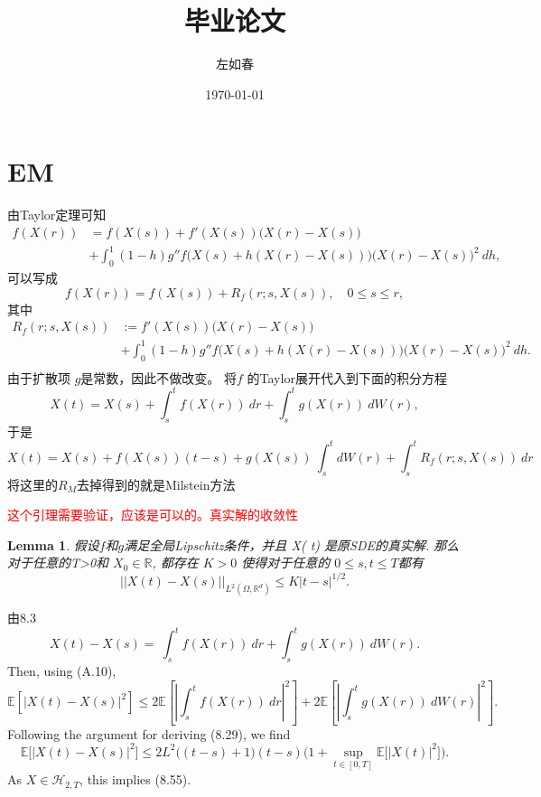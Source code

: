 \documentclass[12pt,final]{article}
\title{毕业论文}
\author{左如春}
\date{\today}
\makeatletter
\numberwithin{equation}{section}
\numberwithin{figure}{section}
\numberwithin{table}{section}
\theoremstyle{plain}
\renewcommand{\proofname}{proof}
\newtheorem{Lemma}[Theorem]{Lemma}      %
\theoremstyle{Definition}
\theoremstyle{Remark}
\renewenvironment{proof}[1][\proofname]{\par
	\pushQED{\qed}%
	\normalfont \topsep6\p@\@plus6\p@\relax
	\trivlist\item[\hskip\labelsep
	\bfseries #1\@addpunct{\,:\,}]\ignorespaces
}{%
	\popQED\endtrivlist\@endpefalse
}
\makeatother
\begin{document}
	
	\maketitle
	
	
	\section{EM}
	由Taylor定理可知
	$$\begin{aligned}
		f(X(r))&=f(X(s))+f'(X(s))\big(X(r)-X(s)\big)\\&+\int_{0}^{1}(1-h)g''f\big(X(s)+h(X(r)-X(s))\big)\big(X(r)-X(s)\big)^{2}\:dh,
	\end{aligned}$$
	可以写成
	$$f(X(r))=f(X(s))+R_f(r;s,X(s)),\quad0\leq s\leq r,$$
	其中
	$$\begin{aligned}
		R_{f}(r;s,X(s))&:=f'(X(s))\big(X(r)-X(s)\big)\\&+\int_{0}^{1}(1-h)g''f\big(X(s)+h(X(r)-X(s))\big)\big(X(r)-X(s)\big)^{2}\:dh.\\
	\end{aligned}$$
	由于扩散项 $g$是常数，因此不做改变。
	将$f$ 的Taylor展开代入到下面的积分方程
	\begin{equation}\label{int}
		X(t)=X(s)+\int_s^tf(X(r))\:dr+\int_s^tg(X(r))\:dW(r),
	\end{equation}
	于是
	\begin{equation}\label{Mil}
		X(t)=X(s)+f(X(s))(t-s)+g(X(s))\:\int_{s}^{t}dW(r)+\int_{s}^{t}R_{f}(r;s,X(s))\:dr
	\end{equation}
	将这里的$R_M$去掉得到的就是Milstein方法
	
	\textcolor{red}{这个引理需要验证，应该是可以的。真实解的收敛性}
	\begin{Lemma}
		假设$f$和$g$满足全局Lipschitz条件，并且  X( t) 是原SDE的真实解. 那么对于任意的T>0和
		${X}_{0}\in \mathbb{R}$, 都存在 $K> 0$ 使得对于任意的 $0\leq s, t\leq T$都有
		\begin{equation}
			||X(t)-X(s)||_{L^2(\Omega,\mathbb{R}^d)}\leq K|t-s|^{1/2}.
		\end{equation}
	\end{Lemma}
	
	\begin{proof}
		由8.3
		$$X(t)-X(s)=\:\int_{s}^{t}f(X(r))\:dr+\int_{s}^{t}g(X(r))\:dW(r).$$
		Then, using (A.10),
		$$\mathbb{E}\left[\left|X(t)-X(s)\right|^2\right]\leq2\mathbb{E}\left[\left|\int_s^tf(X(r))\:dr\right|^2\right]+2\mathbb{E}\left[\left|\int_s^tg(X(r))\:dW(r)\right|^2\right].$$
		Following the argument for deriving (8.29), we find
		$$\mathbb{E}\Big[\left|X(t)-X(s)\right|^2\Big]\leq2L^2\big((t-s)+1\big)(t-s)\bigg(1+\sup\limits_{t\in[0,T]}\mathbb{E}\Big[\left|X(t)\right|^2\bigg]\bigg).$$
		As $X\in\mathcal{H}_{2,T}$, this implies (8.55).
	\end{proof} 
	
\end{document}
